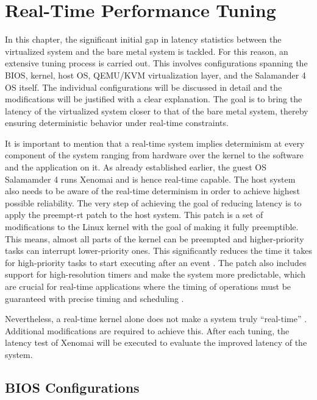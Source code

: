 \documentclass[MMR,Master,english]{twbook}
\begin{document}
\clearpage

\chapter{Real-Time Performance Tuning}\label{cha:real-time_tuning}

In this chapter, the significant initial gap in latency statistics between the virtualized system and the bare metal system is tackled. For this reason, an extensive tuning process is carried out. This involves configurations spanning the BIOS, kernel, host OS, QEMU/KVM virtualization layer, and the Salamander 4 OS itself. The individual configurations will be discussed in detail and the modifications will be justified with a clear explanation. The goal is to bring the latency of the virtualized system closer to that of the bare metal system, thereby ensuring deterministic behavior under real-time constraints.

\bigskip \noindent It is important to mention that a real-time system implies determinism at every component of the system ranging from hardware over the kernel to the software and the application on it. As already established earlier, the guest OS Salamamder 4 runs Xenomai and is hence real-time capable. The host system also needs to be aware of the real-time determinism in order to achieve highest possible reliability. The very step of achieving the goal of reducing latency is to apply the preempt-rt patch \cite{RealtimePreempt_rt_versionsWiki} to the host system. This patch is a set of modifications to the Linux kernel with the goal of making it fully preemptible. This means, almost all parts of the kernel can be preempted and higher-priority tasks can interrupt lower-priority ones. This significantly reduces the time it takes for high-priority tasks to start executing after an event \cite{RealtimeKernelPatchset}. The patch also includes support for high-resolution timers and make the system more predictable, which are crucial for real-time applications where the timing of operations must be guaranteed with precise timing and scheduling \cite{rostedtInternalsRTPatch}. 

\bigskip \noindent Nevertheless, a real-time kernel alone does not make a system truly “real-time” \cite{WhatRealtimeLinux}. Additional modifications are required to achieve this. After each tuning, the latency test of Xenomai will be executed to evaluate the improved latency of the system.

\section{BIOS Configurations}\label{sec:bios_configurations}
\end{document}
